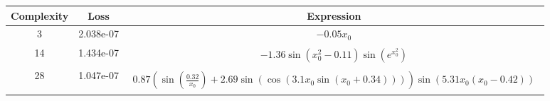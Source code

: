 \begin{center}
        \begin{tabular}{|c|c|c|}
        \hline
        Complexity & Loss & Expression \\
        \hline
        3 & 2.038e-07 & $\begin{aligned}- 0.05 x_{0}\end{aligned}$\\ \hline14 & 1.434e-07 & $\begin{aligned}- 1.36 \sin{\left(x_{0}^{2} - 0.11 \right)} \sin{\left(e^{x_{0}^{2}} \right)}\end{aligned}$\\ \hline28 & 1.047e-07 & $\begin{aligned}0.87 \left(\sin{\left(\frac{0.32}{x_{0}} \right)} + 2.69 \sin{\left(\cos{\left(3.1 x_{0} \sin{\left(x_{0} + 0.34 \right)} \right)} \right)}\right) \sin{\left(5.31 x_{0} \left(x_{0} - 0.42\right) \right)}\end{aligned}$\\ \hline\end{tabular}
        \end{center}
        